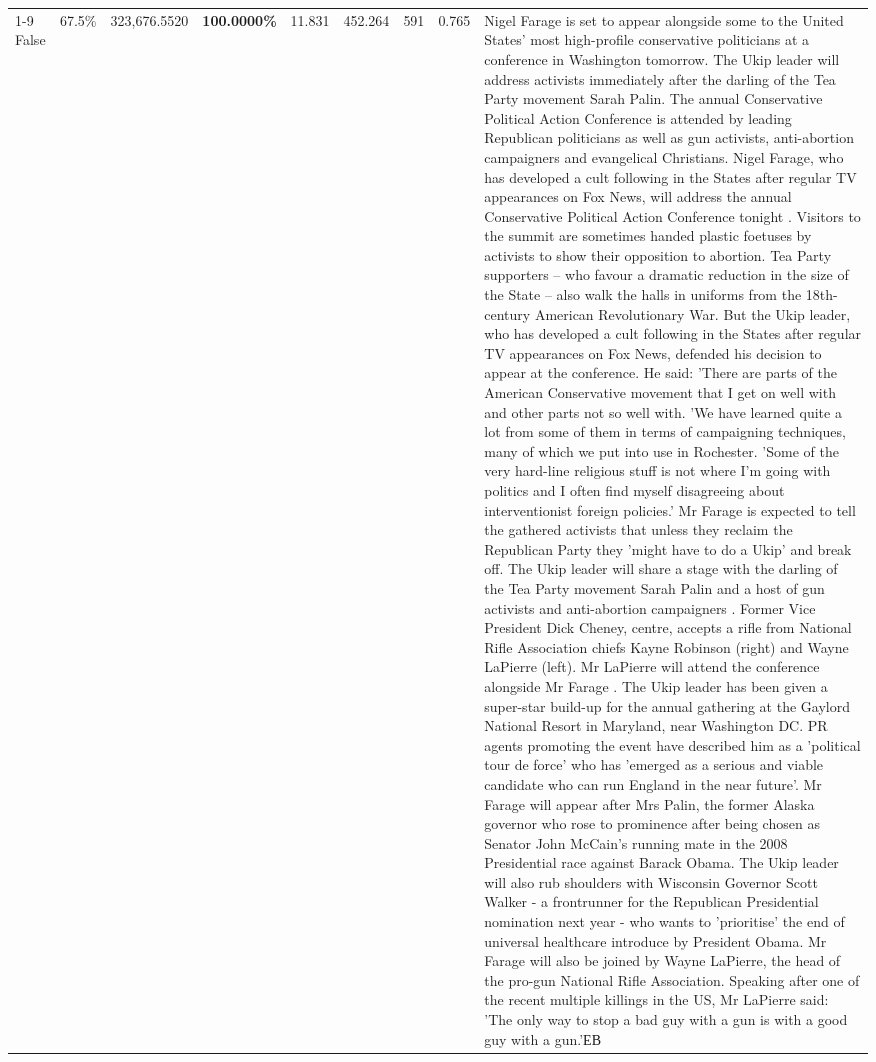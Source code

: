 \begin{table}[H]
\begin{tabular}{lllrlllll}
\cline{1-9}
False & 67.5\% & 323,676.5520 & \bfseries \color{red} 100.0000\% & 11.831 & 452.264 & 591 & 0.765 & Nigel Farage is set to appear alongside some to the United States' most high-profile conservative politicians at a conference in Washington tomorrow. The Ukip leader will address activists immediately after the darling of the Tea Party movement Sarah Palin. The annual Conservative Political Action Conference is attended by leading Republican politicians as well as gun activists, anti-abortion campaigners and evangelical Christians. Nigel Farage, who has developed a cult following in the States after regular TV appearances on Fox News, will address the annual Conservative Political Action Conference tonight . Visitors to the summit are sometimes handed plastic foetuses by activists to show their opposition to abortion. Tea Party supporters – who favour a dramatic reduction in the size of the State – also walk the halls in uniforms from the 18th-century American Revolutionary War. But the Ukip leader, who has developed a cult following in the States after regular TV appearances on Fox News, defended his decision to appear at the conference. He said: 'There are parts of the American Conservative movement that I get on well with and other parts not so well with. 'We have learned quite a lot from some of them in terms of campaigning techniques, many of which we put into use in Rochester. 'Some of the very hard-line religious stuff is not where I'm going with politics and I often find myself disagreeing about interventionist foreign policies.' Mr Farage is expected to tell the gathered activists that unless they reclaim the Republican Party they 'might have to do a Ukip' and break off. The Ukip leader will share a stage with the darling of the Tea Party movement Sarah Palin and a host of gun activists and anti-abortion campaigners . Former Vice President Dick Cheney, centre, accepts a rifle from National Rifle Association chiefs Kayne Robinson (right) and Wayne LaPierre (left). Mr LaPierre will attend the conference alongside Mr Farage . The Ukip leader has been given a super-star build-up for the annual gathering at the Gaylord National Resort in Maryland, near Washington DC. PR agents promoting the event have described him as a 'political tour de force' who has 'emerged as a serious and viable candidate who can run England in the near future'. Mr Farage will appear after Mrs Palin, the former Alaska governor who rose to prominence after being chosen as Senator John McCain's running mate in the 2008 Presidential race against Barack Obama. The Ukip leader will also rub shoulders with Wisconsin Governor Scott Walker - a frontrunner for the Republican Presidential nomination next year - who wants to 'prioritise' the end of universal healthcare introduce by President Obama. Mr Farage will also be joined by Wayne LaPierre, the head of the pro-gun National Rifle Association. Speaking after one of the recent multiple killings in the US, Mr LaPierre said: 'The only way to stop a bad guy with a gun is with a good guy with a gun.'ЕВ \\

\end{tabular}
\end{table}
